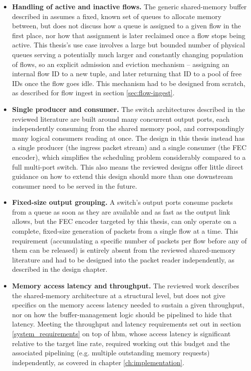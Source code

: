 \begin{itemize}
  \item \textbf{Handling of active and inactive flows.} The generic shared-memory buffer
  described in \cite{inproceedings} assumes a fixed, known set of queues to allocate memory
  between, but does not discuss how a queue is assigned to a given flow in the first place, nor
  how that assignment is later reclaimed once a flow stops being active. This thesis's use case
  involves a large but bounded number of physical queues serving a potentially much larger and
  constantly changing population of flows, so an explicit admission and eviction mechanism --
  assigning an internal flow ID to a new tuple, and later returning that ID to a pool of free
  IDs once the flow goes idle. This mechanism had to be designed from scratch, as described for flow ingest
  in section \ref{sec:flow-ingest}.

  \item \textbf{Single producer and consumer.} The switch architectures described in the
  reviewed literature are built around many concurrent output ports, each independently
  consuming from the shared memory pool, and correspondingly many logical consumers reading at
  once. The design in this thesis instead has a single producer (the ingress packet stream) and
  a single consumer (the FEC encoder), which simplifies the scheduling problem considerably
  compared to a full multi-port switch. This also means the reviewed designs offer little
  direct guidance on how to extend this design should more than one downstream consumer need to
  be served in the future.

  \item \textbf{Fixed-size output grouping.} A switch's output ports consume packets from a
  queue as soon as they are available and as fast as the output link allows, but the 
  FEC encoder targeted by this thesis, can only operate on a complete, fixed-size 
  generation of packets from a single flow at a time. This
    requirement (accumulating a specific number of packets per flow before any of them can be
  released) is entirely absent from the reviewed shared-memory literature and had to be
  designed into the packet reader independently, as described in the design chapter.

  \item \textbf{Memory access latency and throughput.} The reviewed work describes the
  shared-memory architecture at a structural level, but does not give specifics on the memory
  access latency needed to sustain a given throughput, nor on how the buffer-management logic
  should be pipelined to hide that latency. Meeting the throughput and latency requirements set
  out in section \ref{system_requirements} on top of \gls{hbm}, whose access latency is
  significant relative to the target line rate, required working out this budget and the
  associated pipelining (e.g. multiple outstanding memory requests) independently, as covered in
  chapter \ref{ch:implementation}.
\end{itemize}
